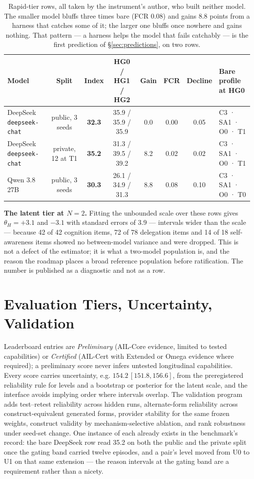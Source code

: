 \begin{table}[!htbp]
\centering\small
\begin{tabularx}{\textwidth}{@{}lccccccY@{}}
\toprule
Model & Split & \textbf{Index} & HG0 / HG1 / HG2 & Gain & FCR & Decline & Bare profile at HG0 \\
\midrule
DeepSeek \texttt{deepseek-chat} & public, 3 seeds & \textbf{32.3} & 35.9 / 35.9 / 35.9 & 0.0 & 0.00 & 0.05 & C3 · SA1 · O0 · T1 \\
DeepSeek \texttt{deepseek-chat} & private, 12 at T1 & \textbf{35.2} & 31.3 / 39.5 / 39.2 & 8.2 & 0.02 & 0.02 & C3 · SA1 · O0 · T1 \\
Qwen 3.8 27B & public, 3 seeds & \textbf{30.3} & 26.1 / 34.9 / 31.3 & 8.8 & 0.08 & 0.10 & C3 · SA1 · O0 · T0 \\
\bottomrule
\end{tabularx}
\caption{Rapid-tier rows, all taken by the instrument's author, who built neither model. The smaller model bluffs three times bare (FCR 0.08) and gains 8.8 points from a harness that catches some of it; the larger one bluffs once nowhere and gains nothing. That pattern --- a harness helps the model that fails catchably --- is the first prediction of \S\ref{sec:predictions}, on two rows.}
\label{tab:rapid}
\end{table}

\textbf{The latent tier at $N = 2$.} Fitting the unbounded scale over these rows gives $\theta_H = +3.1$ and $-3.1$ with standard errors of 3.9 --- intervals wider than the scale --- because 42 of 42 cognition items, 72 of 78 delegation items and 14 of 18 self-awareness items showed no between-model variance and were dropped. This is not a defect of the estimator; it is what a two-model population is, and the reason the roadmap places a broad reference population before ratification. The number is published as a diagnostic and not as a row.

\section{Evaluation Tiers, Uncertainty, Validation}\label{sec:validation}

Leaderboard entries are \emph{Preliminary} (AIL-Core evidence, limited to tested capabilities) or \emph{Certified} (AIL-Cert with Extended or Omega evidence where required); a preliminary score never infers untested longitudinal capabilities. Every score carries uncertainty, e.g. $154.2\,[151.8, 156.6]$, from the preregistered reliability rule for levels and a bootstrap or posterior for the latent scale, and the interface avoids implying order where intervals overlap. The validation program adds test--retest reliability across hidden runs, alternate-form reliability across construct-equivalent generated forms, provider stability for the same frozen weights, construct validity by mechanism-selective ablation, and rank robustness under seed-set change. One instance of each already exists in the benchmark's record: the bare DeepSeek row read 35.2 on both the public and the private split once the gating band carried twelve episodes, and a pair's level moved from U0 to U1 on that same extension --- the reason intervals at the gating band are a requirement rather than a nicety.

